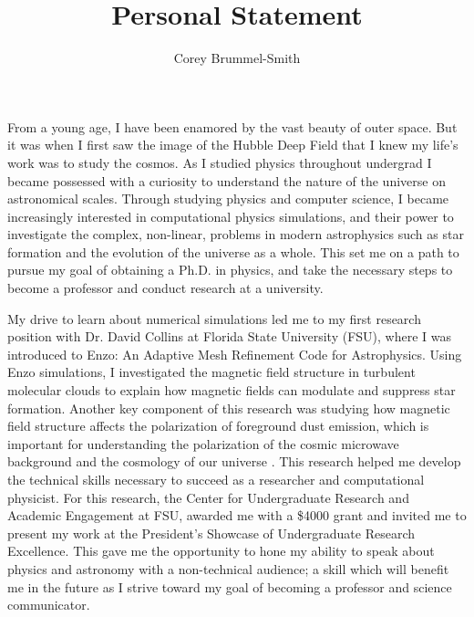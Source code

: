 \documentclass{article}
\title{Personal Statement}
\author{Corey Brummel-Smith}
\date{}
\begin{document}

From a young age, I have been enamored by the vast beauty of outer space. But it was when I first saw the image of the Hubble Deep Field that I knew my life's work was to study the cosmos. As I studied physics throughout undergrad I became possessed with a curiosity to understand the nature of the universe on astronomical scales. Through studying physics and computer science, I became increasingly interested in computational physics simulations, and their power to investigate the complex, non-linear, problems in modern astrophysics such as star formation and the evolution of the universe as a whole. This set me on a path to pursue my goal of obtaining a Ph.D. in physics, and take the necessary steps to become a professor and conduct research at a university. 

My drive to learn about numerical simulations led me to my first research position with Dr. David Collins at Florida State University (FSU), where I was introduced to Enzo: An Adaptive Mesh Refinement Code for Astrophysics. Using Enzo simulations, I investigated the magnetic field structure in turbulent molecular clouds to explain how magnetic fields can modulate and suppress star formation. Another key component of this research was studying how magnetic field structure affects the polarization of foreground dust emission, which is important for understanding the polarization of the cosmic microwave background and the cosmology of our universe \citep{Clark2015}. This research helped me develop the technical skills necessary to succeed as a researcher and computational physicist. For this research, the Center for Undergraduate Research and Academic Engagement at FSU, awarded me with a \$4000 grant and invited me to present my work at the President’s Showcase of Undergraduate Research Excellence. This gave me the opportunity to hone my ability to speak about physics and astronomy with a non-technical audience; a skill which will benefit me in the future as I strive toward my goal of becoming a professor and science communicator. 
\end{document}
